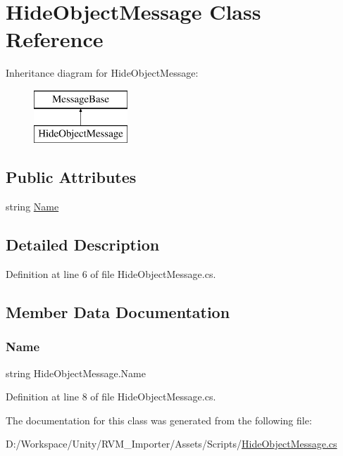 \hypertarget{class_hide_object_message}{}\section{Hide\+Object\+Message Class Reference}
\label{class_hide_object_message}
Inheritance diagram for Hide\+Object\+Message\+:\begin{figure}[H]
\begin{center}
\leavevmode
\includegraphics[height=2.000000cm]{class_hide_object_message}
\end{center}
\end{figure}
\subsection*{Public Attributes}
\begin{DoxyCompactItemize}
\item 
string \mbox{\hyperlink{class_hide_object_message_abe7217566effeb69e20d4776e8b5a220}{Name}}
\end{DoxyCompactItemize}


\subsection{Detailed Description}


Definition at line 6 of file Hide\+Object\+Message.\+cs.



\subsection{Member Data Documentation}
\mbox{\label{class_hide_object_message_abe7217566effeb69e20d4776e8b5a220}} 
\subsubsection{\texorpdfstring{Name}{Name}}
{\footnotesize\ttfamily string Hide\+Object\+Message.\+Name}



Definition at line 8 of file Hide\+Object\+Message.\+cs.



The documentation for this class was generated from the following file\+:\begin{DoxyCompactItemize}
\item 
D\+:/\+Workspace/\+Unity/\+R\+V\+M\+\_\+\+Importer/\+Assets/\+Scripts/\mbox{\hyperlink{_hide_object_message_8cs}{Hide\+Object\+Message.\+cs}}\end{DoxyCompactItemize}
